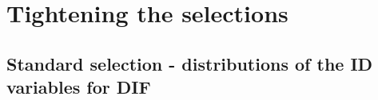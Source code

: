 \section {Tightening the selections}


\subsection{Standard selection - distributions of the ID variables for DIF}



